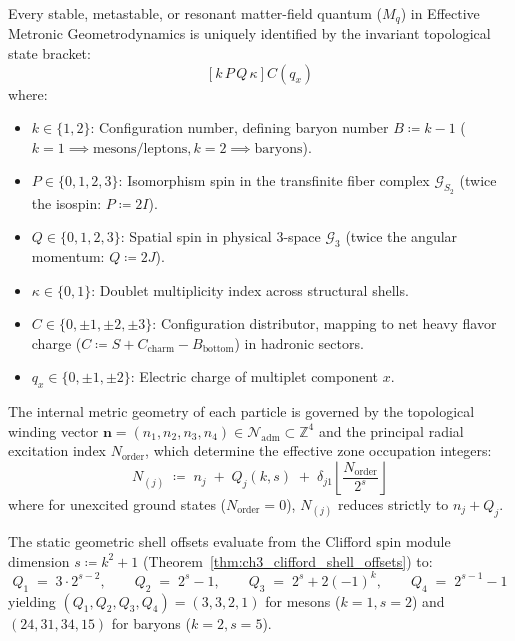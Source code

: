 \documentclass[
    12pt,
    a4paper,
    headings=normal,
    twoside=false,
    open=any,
    parskip=half
]{scrbook}
\newcommand{\spectrumN}{\mathcal{N}_{\text{adm}}}
\begin{document}
Every stable, metastable, or resonant matter-field quantum ($M_q$) in Effective Metronic Geometrodynamics is uniquely identified by the invariant topological state bracket:
\begin{equation}
\left[ k \, P \, Q \, \kappa \right] C \left( q_x \right)
\label{eq:appA_state_bracket_def}
\end{equation}
where:
\begin{itemize}[noitemsep]
    \item $k \in \{1, 2\}$: Configuration number, defining baryon number $B \coloneqq k - 1$ ($k=1 \implies \text{mesons/leptons}, k=2 \implies \text{baryons}$).
    \item $P \in \{0, 1, 2, 3\}$: Isomorphism spin in the transfinite fiber complex $\mathcal{G}_{S_2}$ (twice the isospin: $P \coloneqq 2I$).
    \item $Q \in \{0, 1, 2, 3\}$: Spatial spin in physical 3-space $\mathcal{G}_3$ (twice the angular momentum: $Q \coloneqq 2J$).
    \item $\kappa \in \{0, 1\}$: Doublet multiplicity index across structural shells.
    \item $C \in \{0, \pm 1, \pm 2, \pm 3\}$: Configuration distributor, mapping to net heavy flavor charge ($C \coloneqq S + C_{\text{charm}} - B_{\text{bottom}}$) in hadronic sectors.
    \item $q_x \in \{0, \pm 1, \pm 2\}$: Electric charge of multiplet component $x$.
\end{itemize}

The internal metric geometry of each particle is governed by the topological winding vector $\mathbf{n} = (n_1, n_2, n_3, n_4) \in \spectrumN \subset \mathbb{Z}^4$ and the principal radial excitation index $N_{\text{order}}$, which determine the effective zone occupation integers:
\begin{equation}
N_{(j)} \;\coloneqq\; n_j \;+\; Q_j(k, s) \;+\; \delta_{j1} \left\lfloor \frac{N_{\text{order}}}{2^s} \right\rfloor
\end{equation}
where for unexcited ground states ($N_{\text{order}} = 0$), $N_{(j)}$ reduces strictly to $n_j + Q_j$.

The static geometric shell offsets evaluate from the Clifford spin module dimension $s \coloneqq k^2 + 1$ (Theorem~\ref{thm:ch3_clifford_shell_offsets}) to:
\begin{equation}
Q_1 \;=\; 3 \cdot 2^{s-2}, \qquad Q_2 \;=\; 2^s - 1, \qquad Q_3 \;=\; 2^s + 2(-1)^k, \qquad Q_4 \;=\; 2^{s-1} - 1
\label{eq:appA_shell_offsets_Q}
\end{equation}
yielding $(Q_1, Q_2, Q_3, Q_4) = (3, 3, 2, 1)$ for mesons ($k=1, s=2$) and $(24, 31, 34, 15)$ for baryons ($k=2, s=5$).
\end{document}
